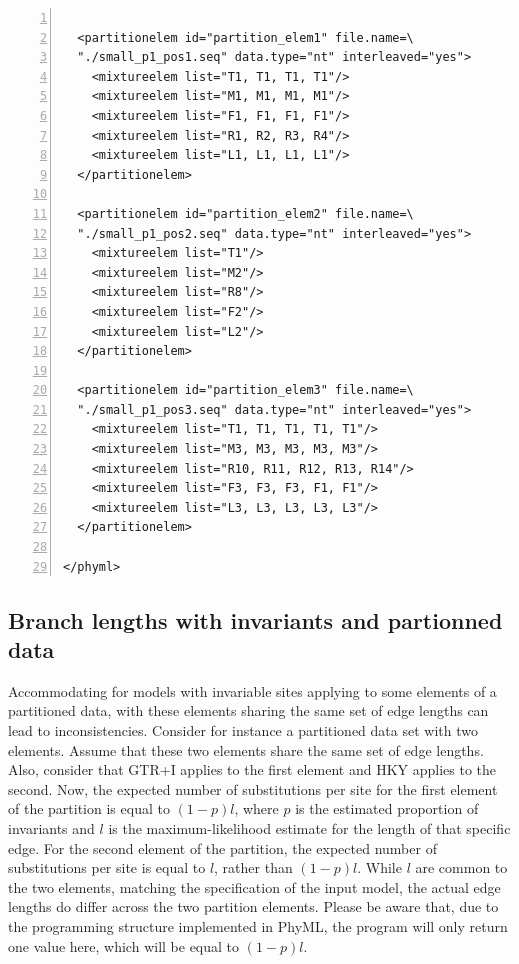 \documentclass[a4paper,12pt]{article}
\begin{document}
\vspace{0.2cm}
\begin{Verbatim}[frame=single, label=Example of PhyML XML file (ctnd), samepage=true,
  baselinestretch=0.5, fontsize=\small, numbers=left]

  <partitionelem id="partition_elem1" file.name=\
  "./small_p1_pos1.seq" data.type="nt" interleaved="yes">
    <mixtureelem list="T1, T1, T1, T1"/>
    <mixtureelem list="M1, M1, M1, M1"/>
    <mixtureelem list="F1, F1, F1, F1"/>
    <mixtureelem list="R1, R2, R3, R4"/>
    <mixtureelem list="L1, L1, L1, L1"/>
  </partitionelem>

  <partitionelem id="partition_elem2" file.name=\
  "./small_p1_pos2.seq" data.type="nt" interleaved="yes">
    <mixtureelem list="T1"/>
    <mixtureelem list="M2"/>
    <mixtureelem list="R8"/>
    <mixtureelem list="F2"/>
    <mixtureelem list="L2"/>
  </partitionelem>

  <partitionelem id="partition_elem3" file.name=\
  "./small_p1_pos3.seq" data.type="nt" interleaved="yes">
    <mixtureelem list="T1, T1, T1, T1, T1"/>
    <mixtureelem list="M3, M3, M3, M3, M3"/>
    <mixtureelem list="R10, R11, R12, R13, R14"/>
    <mixtureelem list="F3, F3, F3, F1, F1"/>
    <mixtureelem list="L3, L3, L3, L3, L3"/>
  </partitionelem>

</phyml>

\end{Verbatim}


\subsection{Branch lengths with invariants and partionned data}

Accommodating for models with invariable sites applying to some elements of a partitioned data, with
these elements  sharing the  same set  of edge lengths  can lead  to inconsistencies.   Consider for
instance a partitioned  data set with two elements.   Assume that these two elements  share the same
set of edge lengths.  Also, consider that GTR+I  applies to the first element and HKY applies to the
second. Now, the expected number of substitutions per site for the first element of the partition is
equal  to  $(1-p)l$,  where  $p$  is  the   estimated  proportion  of  invariants  and  $l$  is  the
maximum-likelihood estimate  for the length  of that  specific edge. For  the second element  of the
partition, the  expected number of  substitutions per  site is equal  to $l$, rather  than $(1-p)l$.
While $l$ are common to the two elements,  matching the specification of the input model, the actual
edge  lengths do  differ across  the  two partition  elements.  Please  be  aware that,  due to  the
programming structure implemented in PhyML, the program  will only return one value here, which will
be equal to $(1-p)l$.
\end{document}
